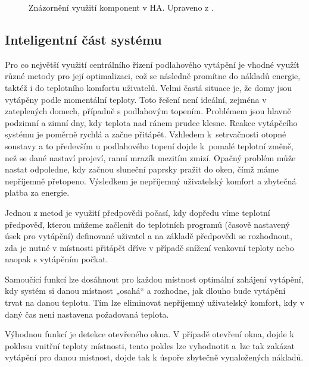 \begin{figure}[H]
    \centering
    \def\svgwidth{\columnwidth}
    
    \caption[Znázornění využití integrací v~HA.]{Znázornění využití komponent v HA. Upraveno z \cite{home-assistant-architektura}.}
    \label{fig:ha-integrace}
\end{figure}



\subsection{Inteligentní část systému}
Pro co největší využití centrálního řízení podlahového vytápění je vhodné využít různé metody pro její optimalizaci, což se následně promítne do nákladů energie, taktéž i do teplotního komfortu uživatelů. Velmi častá situace je, že domy jsou vytápěny podle momentální teploty. Toto řešení není ideální, zejména v zateplených domech, případně s podlahovým topením. Problémem jsou hlavně podzimní a zimní dny, kdy teplota nad ránem prudce klesne. Reakce vytápěcího systému je poměrně rychlá a začne přitápět. Vzhledem k~setrvačnosti otopné soustavy a to především u podlahového topení dojde k~pomalé teplotní změně, než se dané nastaví projeví, ranní mrazík mezitím zmizí. Opačný problém může nastat odpoledne, kdy začnou sluneční paprsky pražit do oken, čímž máme nepříjemně přetopeno. Výsledkem je nepříjemný uživatelský komfort a zbytečná platba za energie.

Jednou z metod je využití předpovědi počasí, kdy dopředu víme teplotní předpověď, kterou můžeme začlenit do teplotních programů (časově nastavený úsek pro vytápění) definované uživatel a na základě  předpovědi se rozhodnout, zda je nutné v místnosti přitápět dříve v případě snížení venkovní teploty nebo naopak s vytápěním počkat. 

Samoučící funkcí lze dosáhnout pro každou místnost optimální zahájení vytápění, kdy systém si danou místnost „osahá“ a rozhodne, jak dlouho bude vytápění trvat na danou teplotu. Tím lze eliminovat nepříjemný uživatelský komfort, kdy v daný čas není nastavena požadovaná teplota.

Výhodnou funkcí je detekce otevřeného okna. V případě otevření okna, dojde k poklesu vnitřní teploty místnosti, tento pokles lze vyhodnotit a~lze tak zakázat vytápění pro danou místnost, dojde  tak k úspoře zbytečně vynaložených nákladů.

